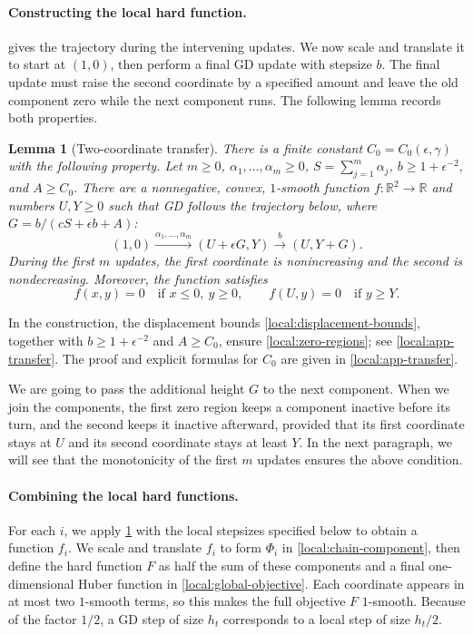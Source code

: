 \documentclass[11pt,letterpaper]{article}
\newtheorem{lemma}[lemma]{Lemma}
\theoremstyle{definition}
\newcommand{\R}{\mathbb R}
\begin{document}
\paragraph{Constructing the local hard function.}
 gives the trajectory during the intervening updates.
We now scale and translate it to start at $(1,0)$, then perform a final GD update with stepsize $b$.
The final update must raise the second coordinate by a specified amount and leave the old component zero while the next component runs.
The following lemma records both properties.

\begin{lemma}[Two-coordinate transfer]
\label{lem:local-transfer}
There is a finite constant $C_0=C_0(\epsilon,\gamma)$ with the following property.
Let $m\ge0$, $\alpha_1,\ldots,\alpha_m\ge0$, $S=\sum_{j=1}^m\alpha_j$, $b\ge1+\epsilon^{-2}$, and $A\ge C_0$.
There are a nonnegative, convex, $1$-smooth function $f:\R^2\to\R$ and numbers $U,Y\ge0$ such that GD follows the trajectory below, where $G=b/(cS+\epsilon b+A)$:
\[
  (1,0)\xrightarrow{\alpha_1,\ldots,\alpha_m}(U+\epsilon G,Y)
  \xrightarrow{b}(U,Y+G).
\]
During the first $m$ updates, the first coordinate is nonincreasing and the second is nondecreasing.
Moreover, the function satisfies
\begin{equation}
  f(x,y)=0\quad\text{if }x\le0,\ y\ge0,
  \qquad
  f(U,y)=0\quad\text{if }y\ge Y.
  \label{local:zero-regions}
\end{equation}
\end{lemma}
In the construction, the displacement bounds \eqref{local:displacement-bounds}, together with $b\ge1+\epsilon^{-2}$ and $A\ge C_0$, ensure \eqref{local:zero-regions}; see \cref{local:app-transfer}.
The proof and explicit formulas for $C_0$ are given in \cref{local:app-transfer}.

We are going to pass the additional height $G$ to the next component.
When we join the components, the first zero region keeps a component inactive before its turn, and the second keeps it inactive afterward, provided that its first coordinate stays at $U$ and its second coordinate stays at least $Y$.
In the next paragraph, we will see that the monotonicity of the first $m$ updates ensures the above condition.


\paragraph{Combining the local hard functions.}
For each $i$, we apply \cref{lem:local-transfer} with the local stepsizes specified below to obtain a function $f_i$.
We scale and translate $f_i$ to form $\Phi_i$ in \eqref{local:chain-component}, then define the hard function $F$ as half the sum of these components and a final one-dimensional Huber function in \eqref{local:global-objective}.
Each coordinate appears in at most two $1$-smooth terms, so this makes the full objective $F$ $1$-smooth.
Because of the factor $1/2$, a GD step of size $h_t$ corresponds to a local step of size $h_t/2$.
\end{document}
